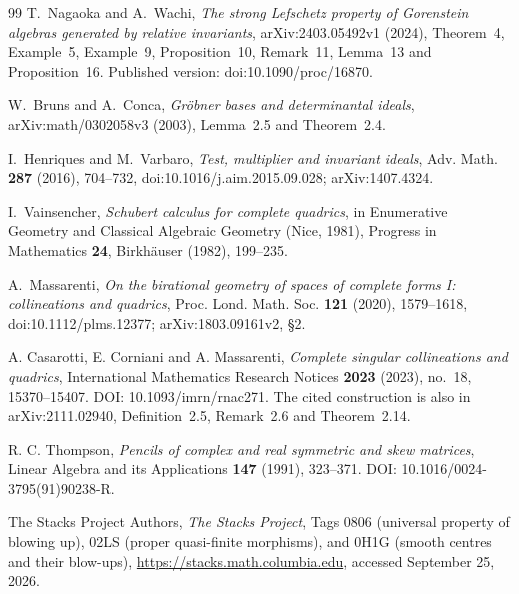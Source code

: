 \documentclass[11pt,reqno]{amsart}
\numberwithin{equation}{section}
\theoremstyle{definition}\newtheorem{definition}[theorem]{Definition}
\theoremstyle{remark}\newtheorem{remark}[theorem]{Remark}
\begin{document}
\begin{thebibliography}{99}
T.~Nagaoka and A.~Wachi,
\emph{The strong Lefschetz property of Gorenstein algebras generated
by relative invariants}, arXiv:2403.05492v1 (2024),
Theorem~4, Example~5, Example~9, Proposition~10, Remark~11,
Lemma~13 and Proposition~16.
Published version: doi:10.1090/proc/16870.

W.~Bruns and A.~Conca,
\emph{Gr\"obner bases and determinantal ideals},
arXiv:math/0302058v3 (2003), Lemma~2.5 and Theorem~2.4.

I.~Henriques and M.~Varbaro,
\emph{Test, multiplier and invariant ideals},
Adv. Math. \textbf{287} (2016), 704--732,
doi:10.1016/j.aim.2015.09.028; arXiv:1407.4324.

I.~Vainsencher,
\emph{Schubert calculus for complete quadrics},
in Enumerative Geometry and Classical Algebraic Geometry (Nice, 1981),
Progress in Mathematics \textbf{24}, Birkh\"auser (1982), 199--235.

A.~Massarenti,
\emph{On the birational geometry of spaces of complete forms I:
collineations and quadrics},
Proc. Lond. Math. Soc. \textbf{121} (2020), 1579--1618,
doi:10.1112/plms.12377; arXiv:1803.09161v2, \S2.

A. Casarotti, E. Corniani and A. Massarenti,
\emph{Complete singular collineations and quadrics},
International Mathematics Research Notices \textbf{2023} (2023),
no.~18, 15370--15407. DOI: 10.1093/imrn/rnac271.
The cited construction is also in arXiv:2111.02940,
Definition~2.5, Remark~2.6 and Theorem~2.14.

R. C. Thompson, \emph{Pencils of complex and real symmetric and skew
matrices}, Linear Algebra and its Applications \textbf{147} (1991),
323--371. DOI: 10.1016/0024-3795(91)90238-R.


The Stacks Project Authors, \emph{The Stacks Project},
Tags 0806 (universal property of blowing up), 02LS (proper quasi-finite
morphisms), and 0H1G (smooth centres and their blow-ups),
\url{https://stacks.math.columbia.edu}, accessed September 25, 2026.

\end{thebibliography}
\end{document}
